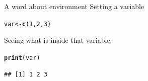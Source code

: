 \documentclass{beamer}\usepackage[]{graphicx}\usepackage[]{color}
\makeatletter
\newcommand{\hlnum}[1]{\textcolor[rgb]{0.686,0.059,0.569}{#1}}%
\newcommand{\hlstd}[1]{\textcolor[rgb]{0.345,0.345,0.345}{#1}}%
\newcommand{\hlkwb}[1]{\textcolor[rgb]{0.69,0.353,0.396}{#1}}%
\newcommand{\hlkwd}[1]{\textcolor[rgb]{0.737,0.353,0.396}{\textbf{#1}}}%
\newenvironment{kframe}{%
 \def\at@end@of@kframe{}%
 \ifinner\ifhmode%
  \def\at@end@of@kframe{\end{minipage}}%
  \begin{minipage}{\columnwidth}%
 \fi\fi%
 \def\FrameCommand##1{\hskip\@totalleftmargin \hskip-\fboxsep
 \colorbox{shadecolor}{##1}\hskip-\fboxsep
     \hskip-\linewidth \hskip-\@totalleftmargin \hskip\columnwidth}%
 \MakeFramed {\advance\hsize-\width
   \@totalleftmargin\z@ \linewidth\hsize
   \@setminipage}}%
 {\par\unskip\endMakeFramed%
 \at@end@of@kframe}
\newenvironment{knitrout}{}{} %
\makeatother
\begin{document}
\begin{frame}[fragile]{A word about environment}
Setting a variable
\begin{knitrout}
\color{fgcolor}\begin{kframe}
\begin{alltt}
\hlstd{var} \hlkwb{<-} \hlkwd{c}\hlstd{(}\hlnum{1}\hlstd{,} \hlnum{2}\hlstd{,} \hlnum{3}\hlstd{)}
\end{alltt}
\end{kframe}
\end{knitrout}

Seeing what is inside that variable.
\begin{knitrout}
\color{fgcolor}\begin{kframe}
\begin{alltt}
\hlkwd{print}\hlstd{(var)}
\end{alltt}
\begin{verbatim}
## [1] 1 2 3
\end{verbatim}
\end{kframe}
\end{knitrout}

\end{frame}
\end{document}
